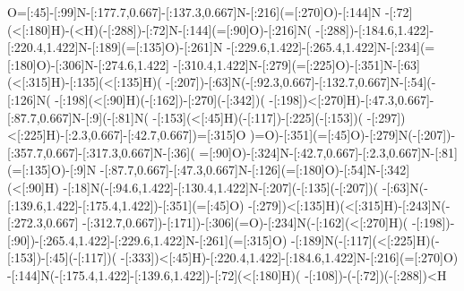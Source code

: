 O=[:45]-[:99]N-[:177.7,0.667]-[:137.3,0.667]N-[:216](=[:270]O)-[:144]N%
-[:72](<[:180]H)-(<H)(-[:288]\phantom{N})-[:72]N-[:144](=[:90]O)-[:216]N(%
-[:288])-[:184.6,1.422]-[:220.4,1.422]N-[:189](=[:135]O)-[:261]N%
-[:229.6,1.422]-[:265.4,1.422]N-[:234](=[:180]O)-[:306]N-[:274.6,1.422]%
-[:310.4,1.422]N-[:279](=[:225]O)-[:351]N-[:63](<[:315]H)-[:135](<[:135]H)(%
-[:207]\phantom{N})-[:63]N(-[:92.3,0.667]-[:132.7,0.667]N-[:54](-[:126]N(%
-[:198](<[:90]H)(-[:162]\phantom{N})-[:270](-[:342]\phantom{N})(%
-[:198]\phantom{N})<[:270]H)-[:47.3,0.667]-[:87.7,0.667]N-[:9](-[:81]N(%
-[:153](<[:45]H)(-[:117]\phantom{N})-[:225](-[:153]\phantom{N})(%
-[:297]\phantom{N})<[:225]H)-[:2.3,0.667]-[:42.7,0.667]\phantom{N})=[:315]O%
)=O)-[:351](=[:45]O)-[:279]N(-[:207])-[:357.7,0.667]-[:317.3,0.667]N-[:36](%
=[:90]O)-[:324]N-[:42.7,0.667]-[:2.3,0.667]N-[:81](=[:135]O)-[:9]N%
-[:87.7,0.667]-[:47.3,0.667]N-[:126](=[:180]O)-[:54]N-[:342](<[:90]H)%
-[:18]N(-[:94.6,1.422]-[:130.4,1.422]N-[:207](-[:135](-[:207]\phantom{N})(%
-[:63]N(-[:139.6,1.422]-[:175.4,1.422]\phantom{N})-[:351](=[:45]O)%
-[:279]\phantom{N})<[:135]H)(<[:315]H)-[:243]N(-[:272.3,0.667]%
-[:312.7,0.667]\phantom{N})-[:171])-[:306](=O)-[:234]N(-[:162](<[:270]H)(%
-[:198]\phantom{N})-[:90])-[:265.4,1.422]-[:229.6,1.422]N-[:261](=[:315]O)%
-[:189]N(-[:117](<[:225]H)(-[:153]\phantom{N})-[:45](-[:117]\phantom{N})(%
-[:333]\phantom{N})<[:45]H)-[:220.4,1.422]-[:184.6,1.422]N-[:216](=[:270]O)%
-[:144]N(-[:175.4,1.422]-[:139.6,1.422]\phantom{N})-[:72](<[:180]H)(%
-[:108]\phantom{N})-(-[:72]\phantom{N})(-[:288]\phantom{N})<H